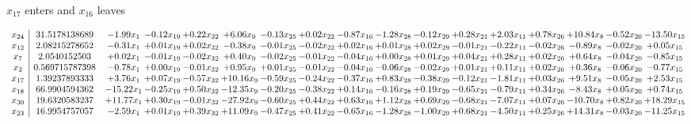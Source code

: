 \documentclass[9pt]{article}
\begin{document}
 $ x_{17} $ enters and $ x_{16} $ leaves 

 \[\begin{array}{c| c c@{\hskip 2pt} c@{\hskip 2pt} c@{\hskip 2pt} c@{\hskip 2pt} c@{\hskip 2pt} c@{\hskip 2pt} c@{\hskip 2pt} c@{\hskip 2pt} c@{\hskip 2pt} c@{\hskip 2pt} c@{\hskip 2pt} c@{\hskip 2pt} c@{\hskip 2pt} c@{\hskip 2pt} c@{\hskip 2pt} }
 x_{24}   &  31.5178138689 & -1.99 x_{1} & -0.12 x_{19} & +  0.22 x_{32} & +  6.06 x_{9} & -0.13 x_{25} & +  0.02 x_{22} & -0.87 x_{16} & -1.28 x_{28} & -0.12 x_{29} & +  0.28 x_{21} & +  2.03 x_{11} & +  0.78 x_{26} & + 10.84 x_{8} & -0.52 x_{20} & -13.50 x_{15}\\
 x_{12}   &  2.08215278652 & -0.31 x_{1} & +  0.01 x_{19} & +  0.02 x_{32} & -0.38 x_{9} & -0.01 x_{25} & -0.02 x_{22} & +  0.02 x_{16} & +  0.01 x_{28} & +  0.02 x_{29} & -0.01 x_{21} & -0.22 x_{11} & -0.02 x_{26} & -0.89 x_{8} & -0.02 x_{20} & +  0.05 x_{15}\\
 x_{7}   &  2.0540152503 & +  0.02 x_{1} & -0.01 x_{19} & -0.02 x_{32} & +  0.40 x_{9} & -0.02 x_{25} & -0.01 x_{22} & -0.04 x_{16} & +  0.00 x_{28} & +  0.01 x_{29} & +  0.04 x_{21} & +  0.28 x_{11} & +  0.02 x_{26} & +  0.64 x_{8} & -0.04 x_{20} & -0.85 x_{15}\\
 x_{2}   &  0.569715787398 & -0.78 x_{1} & +  0.00 x_{19} & -0.01 x_{32} & +  0.95 x_{9} & +  0.01 x_{25} & -0.01 x_{22} & -0.04 x_{16} & -0.06 x_{28} & -0.02 x_{29} & +  0.01 x_{21} & +  0.11 x_{11} & +  0.02 x_{26} & +  0.36 x_{8} & -0.06 x_{20} & -0.77 x_{15}\\
 x_{17}   &  1.39237893333 & +  3.76 x_{1} & +  0.07 x_{19} & -0.57 x_{32} & + 10.16 x_{9} & -0.59 x_{25} & -0.24 x_{22} & -0.37 x_{16} & +  0.83 x_{28} & -0.38 x_{29} & -0.12 x_{21} & -1.81 x_{11} & +  0.03 x_{26} & +  9.51 x_{8} & -0.05 x_{20} & +  2.53 x_{15}\\
 x_{18}   &  66.9904594362 & -15.22 x_{1} & -0.25 x_{19} & +  0.50 x_{32} & -12.35 x_{9} & -0.20 x_{25} & -0.38 x_{22} & +  0.14 x_{16} & -0.16 x_{28} & +  0.19 x_{29} & -0.65 x_{21} & -0.79 x_{11} & +  0.34 x_{26} & -8.43 x_{8} & +  0.05 x_{20} & +  0.74 x_{15}\\
 x_{30}   &  19.6320583237 & + 11.77 x_{1} & +  0.30 x_{19} & -0.01 x_{32} & -27.92 x_{9} & -0.60 x_{25} & +  0.44 x_{22} & +  0.63 x_{16} & +  1.12 x_{28} & +  0.69 x_{29} & -0.68 x_{21} & -7.07 x_{11} & +  0.07 x_{26} & -10.70 x_{8} & +  0.82 x_{20} & + 18.29 x_{15}\\
 x_{23}   &  16.9954757057 & -2.59 x_{1} & +  0.01 x_{19} & +  0.39 x_{32} & + 11.09 x_{9} & -0.47 x_{25} & +  0.41 x_{22} & -0.65 x_{16} & -1.28 x_{28} & -1.00 x_{29} & +  0.68 x_{21} & -4.50 x_{11} & +  0.25 x_{26} & + 14.31 x_{8} & -0.03 x_{20} & -11.25 x_{15}\\

\end{array}\]
\end{document}
